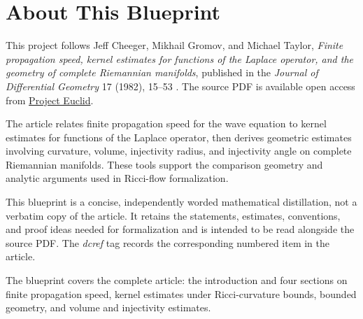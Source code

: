 

\chapter*{About This Blueprint}

This project follows Jeff Cheeger, Mikhail Gromov, and Michael Taylor,
\emph{Finite propagation speed, kernel estimates for functions of the Laplace
operator, and the geometry of complete Riemannian manifolds}, published in the
\emph{Journal of Differential Geometry} 17 (1982), 15--53
\cite{CheegerGromovTaylor1982}. The source PDF is available open access from
\href{https://projecteuclid.org/journals/journal-of-differential-geometry/volume-17/issue-1/Finite-propagation-speed-kernel-estimates-for-functions-of-the-Laplace/10.4310/jdg/1214436699.pdf}{Project Euclid}.

The article relates finite propagation speed for the wave equation to kernel
estimates for functions of the Laplace operator, then derives geometric
estimates involving curvature, volume, injectivity radius, and injectivity
angle on complete Riemannian manifolds. These tools support the comparison
geometry and analytic arguments used in Ricci-flow formalization.

This blueprint is a concise, independently worded mathematical distillation,
not a verbatim copy of the article. It retains the statements, estimates,
conventions, and proof ideas needed for formalization and is intended to be
read alongside the source PDF. The \emph{dcref} tag records the corresponding
numbered item in the article.

The blueprint covers the complete article: the introduction and four sections
on finite propagation speed, kernel estimates under Ricci-curvature bounds,
bounded geometry, and volume and injectivity estimates.






